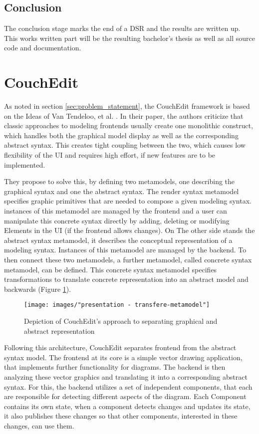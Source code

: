 \subsection{Conclusion}
The conclusion stage marks the end of a DSR and the results are written up. This works written part will be the resulting bachelor's thesis as well as all source code and documentation.


\section{CouchEdit}
\label{sec:CouchEdit}
As noted in section \ref{sec:problem_statement}, the CouchEdit framework is based on the Ideas of Van Tendeloo, et al. \cite{van_tendeloo_concrete_2017}. In their paper, the authors criticize that classic approaches to modeling frontends usually create one monolithic construct, which handles both the graphical model display as well as the corresponding abstract syntax. This creates tight coupling between the two, which causes low flexibility of the UI and requires high effort, if new features are to be implemented. 

They propose to solve this, by defining two metamodels, one describing the graphical syntax and one the abstract syntax. The render syntax metamodel specifies graphic primitives that are needed to compose a given modeling syntax. instances of this metamodel are managed by the frontend and a user can manipulate this concrete syntax directly by adding, deleting or modifying Elements in the UI (if the frontend allows changes). On The other side stands the abstract syntax metamodel, it describes the conceptual representation of a modeling syntax. Instances of this metamodel are managed by the backend. To then connect these two metamodels, a further metamodel, called concrete syntax metamodel, can be defined. This concrete syntax metamodel specifies transformations to translate concrete representation into an abstract model and backwards (Figure \ref{fig:transmm}). 

\begin{figure}
  \centering
  \texttt{[image: images/"presentation - transfere-metamodel"]}
  \caption{Depiction of CouchEdit's approach to separating graphical and abstract representation}
  \label{fig:transmm}
  \end{figure}

Following this architecture, CouchEdit separates frontend from the abstract syntax model. The frontend at its core is a simple vector drawing application, that implements further functionality for diagrams. The backend is then analyzing these vector graphics and translating it into a corresponding abstract syntax. For this, the backend utilizes a set of independent components, that each are responsible for detecting different aspects of the diagram. Each Component contains its own state, when a component detects changes and updates its state, it also publishes these changes so that other components, interested in these changes, can use them.  

